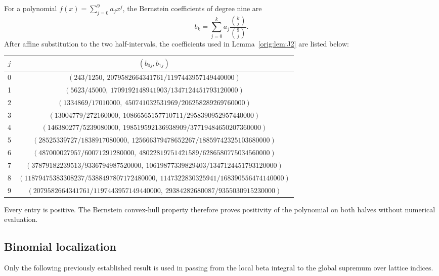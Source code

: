 \documentclass[11pt,a4paper]{article}
\numberwithin{equation}{section}
\theoremstyle{definition}
\theoremstyle{remark}
\begin{document}
For a polynomial $f(x)=\sum_{j=0}^9a_jx^j$, the Bernstein coefficients of
degree nine are
\[
 b_k=\sum_{j=0}^k a_j\frac{\binom{k}{j}}{\binom{9}{j}}.
\]
After affine substitution to the two half-intervals, the coefficients used
in Lemma~\ref{orig:lem:J2} are listed below:
\begin{center}\scriptsize
\begin{tabular}{c|c}
$j$ & $(b_{0j},b_{1j})$\\ \hline
0 & $(243/1250,\ 2079582664341761/1197443957149440000)$\\
1 & $(5623/45000,\ 1709192148941903/1347124451793120000)$\\
2 & $(1334869/17010000,\ 450741032531969/206258289269760000)$\\
3 & $(13004779/272160000,\ 10866565157710711/2958390952957440000)$\\
4 & $(146380277/5239080000,\ 198519592136938909/37719484650207360000)$\\
5 & $(28525339727/1838917080000,\ 125666379478652267/18859742325103680000)$\\
6 & $(487000027957/60071291280000,\ 48022819751421589/6286580775034560000)$\\
7 & $(37879182239513/9336794987520000,\ 10619877339829403/1347124451793120000)$\\
8 & $(11879475383308237/5388497807172480000,\ 1147322830325941/168390556474140000)$\\
9 & $(2079582664341761/1197443957149440000,\ 29384282680087/9355030915230000)$
\end{tabular}
\end{center}
Every entry is positive.  The Bernstein convex-hull property therefore
proves positivity of the polynomial on both halves without numerical
evaluation.

\subsection{Binomial localization}\label{orig:app:binloc}

Only the following previously established result is used in passing from
the local beta integral to the global supremum over lattice indices.
\end{document}
